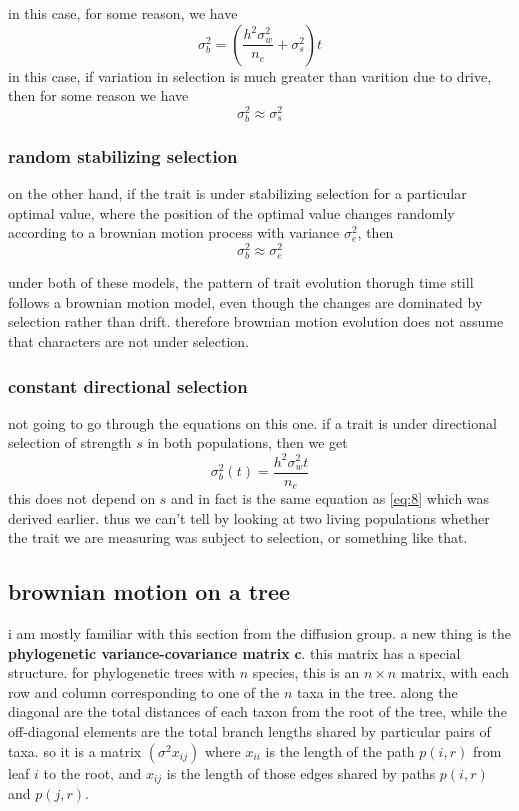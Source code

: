 \documentclass{article}
\newcommand{\bvar}{\sigma_{b}^{2}}  %
\newcommand{\wvar}{\sigma_{w}^{2}}  %
\newcommand{\svar}{\sigma_{s}^{2}}  %
\begin{document}
in this case, for some reason, we have
\begin{equation}
  \label{eq:9}
  \bvar = \left( \frac{h^{2}\wvar}{n_{e}}+ \svar \right)t
\end{equation}
in this case, if variation in selection is much greater than varition due to
drive, then for some reason we have
\begin{equation}
  \label{eq:3}
  \bvar \approx \svar
\end{equation}

\subsubsection{random stabilizing selection}

on the other hand, if the trait is under stabilizing selection for a particular
optimal value, where the position of the optimal value changes randomly
according to a brownian motion process with variance $\sigma_{e}^{2}$, then
\begin{equation*}
  \bvar \approx \sigma^{2}_{e}
\end{equation*}

under both of these models, the pattern of trait evolution thorugh time still
follows a brownian motion model, even though the changes are dominated by
selection rather than drift. therefore brownian motion evolution does not assume
that characters are not under selection.

\subsubsection{constant directional selection}

not going to go through the equations on this one. if a trait is under
directional selection of strength $s$ in both populations, then we get
\begin{equation}
  \label{eq:10}
  \bvar(t) = \frac{h^{2}\wvar t}{n_{e}}
\end{equation}
this does not depend on $s$ and in fact is the same equation as \eqref{eq:8}
which was derived earlier. thus we can't tell by looking at two living
populations whether the trait we are measuring was subject to selection, or
something like that.

\subsection{brownian motion on a tree}
i am mostly familiar with this section from the diffusion group. a new thing is
the \textbf{phylogenetic variance-covariance matrix} \textbf{c}. this matrix has a special
structure. for phylogenetic trees with $n$ species, this is an $n\times n$
matrix, with each row and column corresponding to one of the $n$ taxa in the tree.
along the diagonal are the total distances of each taxon from the root of the
tree, while the off-diagonal elements are the total branch lengths shared by
particular pairs of taxa. so it is a matrix $(\sigma^{2}x_{ij})$ where $x_{ii}$
is the length of the path $p(i,r)$ from leaf $i$ to the root, and $x_{ij}$ is
the length of those edges shared by paths $p(i,r)$ and $p(j,r)$.
\end{document}
